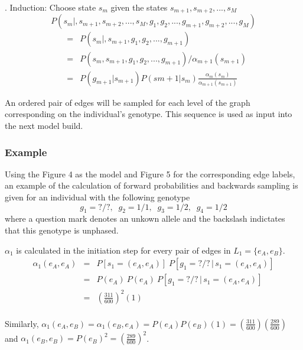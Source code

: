 \documentclass[a4paper,11pt,twoside,abstraction,titlepage]{article}
\begin{document}
\vspace{10pt}
. Induction: Choose state $s_m$ given the states $s_{m+1},s_{m+2},...,s_M$
\begin{equation*}
P(s_m|,s_{m+1},s_{m+2},...,s_M,g_1,g_2,...,g_{m+1},g_{m+2},...,g_M)
\end{equation*} \vspace{-25pt}
\begin{eqnarray*}
&=&  P(s_m|,s_{m+1},g_1,g_2,...,g_{m+1}) \\
&=& P(s_m,s_{m+1},g_1,g_2,...,g_{m+1})/\alpha_{m+1}(s_{m+1}) \\
&=& P(g_{m+1}|s_{m+1}) P(s{m+1}|s_m) \frac{\alpha_m(s_m)}{\alpha_{m+1}(s_{m+1})}
\end{eqnarray*}

\noindent An ordered pair of edges will be sampled for each level of the graph corresponding on the individual's genotype.  This sequence is used as input into the next model build. \cite{beagle2}


\subsubsection{Example}
Using the Figure 4 as the model and Figure 5 for the corresponding edge labels, an example of the calculation of forward probabilities and backwards sampling is given for an individual with the following genotype
\begin{equation*}
g_1 = ?/?, \;\; g_2 = 1/1, \;\; g_3 = 1/2, \;\; g_4 = 1/2
\end{equation*}
where a question mark denotes an unkown allele and the backslash indictates that this genotype is unphased.
\vspace{10pt}

\noindent $\alpha_1$ is calculated in the initiation step for every pair of edges in $L_1 = \{e_{A}, e_{B}\}$.
\begin{eqnarray*}
\alpha_1(e_A,e_A) &=& P[s_1 = (e_A, e_A)] \; P[g_1=?/? \, | \, s_1 = (e_A,e_A)] \\
&=& P(e_A) \: P(e_A) \: P[g_1=?/? \, | \, s_1 = (e_A,e_A)] \\
&=& \left(\frac{311}{600}\right)^2\!\!(1)  \\
\end{eqnarray*}
\vspace{-20pt}

\noindent Similarly, $\alpha_1(e_A,e_B)  = \alpha_1(e_B,e_A)  = P(e_A)P(e_B)(1) = \left(\frac{311}{600}\right)\!\left(\frac{289}{600}\right)$ 
and $\alpha_1(e_B,e_B) = P(e_B)^2 = \left(\frac{289}{600}\right)^2$.
\end{document}
